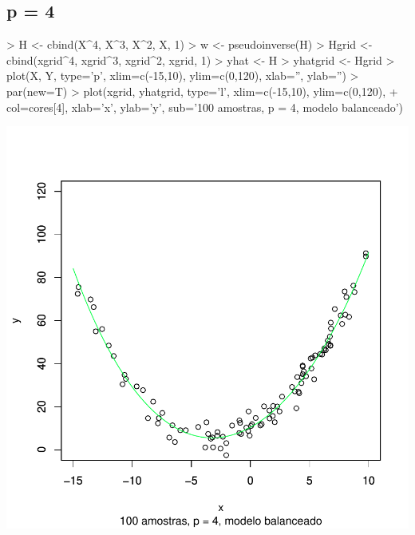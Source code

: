 \documentclass{article}
\begin{document}
\subsection{p = 4}
\begin{Schunk}
\begin{Sinput}
> H <- cbind(X^4, X^3, X^2, X, 1)
> w <- pseudoinverse(H) %
> Hgrid <- cbind(xgrid^4, xgrid^3, xgrid^2, xgrid, 1)
> yhat <- H %
> yhatgrid <- Hgrid %
> plot(X, Y, type='p', xlim=c(-15,10), ylim=c(0,120), xlab='', ylab='')
> par(new=T)
> plot(xgrid, yhatgrid, type='l', xlim=c(-15,10), ylim=c(0,120),
+      col=cores[4], xlab='x', ylab='y', sub='100 amostras, p = 4, modelo balanceado')
\end{Sinput}
\end{Schunk}
\includegraphics{aprox-014}
\end{document}
